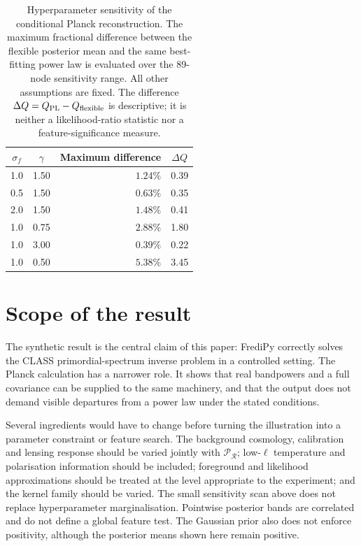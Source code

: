 \documentclass[11pt,a4paper]{article}
\newcommand{\PR}{\mathcal P_{\mathcal R}}
\begin{document}
\begin{table}[htb]
\centering
\caption{Hyperparameter sensitivity of the conditional Planck reconstruction.
The maximum fractional difference between the flexible posterior mean and the
same best-fitting power law is evaluated over the 89-node sensitivity range.
All other assumptions are fixed.  The difference
$\Delta Q=Q_{\rm PL}-Q_{\rm flexible}$ is descriptive; it is neither a
likelihood-ratio statistic nor a feature-significance measure.}
\label{tab:gp-sensitivity}
\small
\begin{tabular}{ccrc}
\toprule
$\sigma_f$ & $\gamma$ & Maximum difference & $\Delta Q$ \\
\midrule
1.0 & 1.50 & $1.24\%$ & 0.39 \\
0.5 & 1.50 & $0.63\%$ & 0.35 \\
2.0 & 1.50 & $1.48\%$ & 0.41 \\
1.0 & 0.75 & $2.88\%$ & 1.80 \\
1.0 & 3.00 & $0.39\%$ & 0.22 \\
1.0 & 0.50 & $5.38\%$ & 3.45 \\
\bottomrule
\end{tabular}
\end{table}

\section{Scope of the result}
\label{sec:scope}

The synthetic result is the central claim of this paper: FrediPy correctly
solves the CLASS primordial-spectrum inverse problem in a controlled setting.
The Planck calculation has a narrower role.  It shows that real bandpowers and
a full covariance can be supplied to the same machinery, and that the output
does not demand visible departures from a power law under the stated
conditions.

Several ingredients would have to change before turning the illustration into
a parameter constraint or feature search.  The background cosmology,
calibration and lensing response should be varied jointly with $\PR$; low-$\ell$
temperature and polarisation information should be included; foreground and
likelihood approximations should be treated at the level appropriate to the
experiment; and the kernel family should be varied.  The small sensitivity
scan above does not replace hyperparameter marginalisation.  Pointwise
posterior bands are correlated and do not define a global feature test.  The
Gaussian prior also does not enforce positivity, although the posterior means
shown here remain positive.
\end{document}
